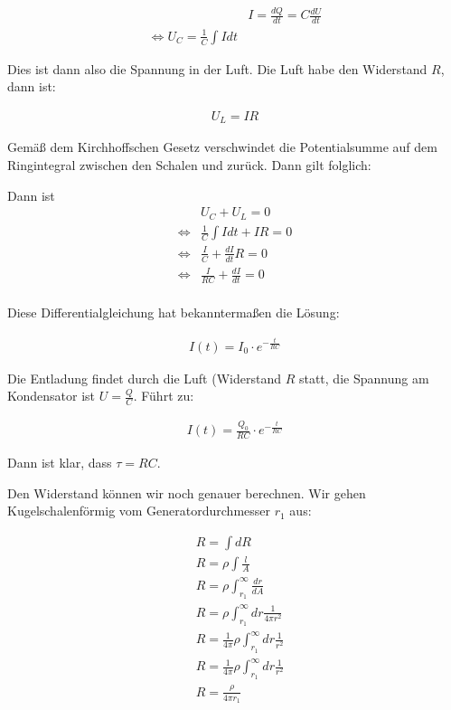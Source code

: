 \documentclass[a4paper,german,12pt,smallheadings]{scrartcl}
\begin{document}
\begin{align*}
  &I = \frac{dQ}{dt} = C \frac{dU}{dt} \\
  \Leftrightarrow U_C = \frac{1}{C} \int I dt
\end{align*}

Dies ist dann also die Spannung in der Luft. Die Luft habe den Widerstand $R$, dann ist:

\begin{align*}
  U_L = IR
\end{align*}

Gemäß dem Kirchhoffschen Gesetz verschwindet die Potentialsumme auf dem
Ringintegral zwischen den Schalen und zurück. Dann gilt folglich:

Dann ist
\begin{align*}
  &U_C + U_L = 0 \\
  \Leftrightarrow &\frac{1}{C} \int I dt + IR = 0 \\
  \Leftrightarrow &\frac{I}{C} + \frac{dI}{dt} R = 0 \\
  \Leftrightarrow &\frac{I}{RC} + \frac{dI}{dt} = 0 \\
\end{align*}

Diese Differentialgleichung hat bekanntermaßen die Lösung:

\begin{align*}
  I(t) = I_0 \cdot e^{-\frac{t}{RC}}
\end{align*}

Die Entladung findet durch die Luft (Widerstand $R$ statt, die Spannung am
Kondensator ist $U = \frac{Q}{C}$. Führt zu:

\begin{align*}
  I(t) = \frac{Q_0}{RC} \cdot e^{-\frac{t}{RC}}
\end{align*}

Dann ist klar, dass $\tau = RC$.

Den Widerstand können wir noch genauer berechnen. Wir gehen Kugelschalenförmig vom Generatordurchmesser $r_1$ aus:

\begin{align*}
  &R = \int dR \\
  &R = \rho \int \frac{l}{A} \\
  &R = \rho \int_{r_1}^\infty \frac{dr}{dA} \\
  &R = \rho \int_{r_1}^\infty dr \frac{1}{4 \pi r^2} \\
  &R = \frac{1}{4 \pi}\rho \int_{r_1}^\infty dr \frac{1}{r^2} \\
  &R = \frac{1}{4 \pi}\rho \int_{r_1}^\infty dr \frac{1}{r^2} \\
  &R = \frac{\rho}{4 \pi r_1}
\end{align*}
\end{document}
